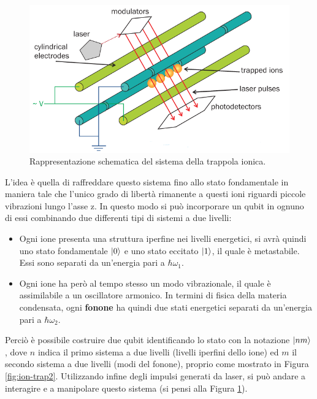 \begin{figure}[!t]
    \centering
    \includegraphics[scale=0.5]{images/ion-trap1}
    \caption{Rappresentazione schematica del sistema della trappola ionica.}
    \label{fig:ion-trap1}
\end{figure}

\noindent L'idea è quella di raffreddare questo sistema fino allo stato fondamentale in maniera tale che l'unico grado di libertà rimanente a questi ioni riguardi piccole vibrazioni lungo l'asse z. In questo modo si può incorporare un qubit in ognuno di essi combinando due differenti tipi di sistemi a due livelli:
\begin{itemize}
    \item Ogni ione presenta una struttura iperfine nei livelli energetici, si avrà quindi uno stato fondamentale $\ket 0$ e uno stato eccitato $\ket 1$, il quale è metastabile. Essi sono separati da un'energia pari a $\hbar\omega_1$.
    
    \item Ogni ione ha però al tempo stesso un modo vibrazionale, il quale è assimilabile a un oscillatore armonico. In termini di fisica della materia condensata, ogni \textbf{fonone} ha quindi due stati energetici separati da un'energia pari a $\hbar\omega_2$.
\end{itemize}

\noindent Perciò è possibile costruire due qubit identificando lo stato con la notazione $\ket{nm}$, dove $n$ indica il primo sistema a due livelli (livelli iperfini dello ione) ed $m$ il secondo sistema a due livelli (modi del fonone), proprio come mostrato in Figura \ref{fig:ion-trap2}. Utilizzando infine degli impulsi generati da laser, si può andare a interagire e a manipolare questo sistema (si pensi alla Figura \ref{fig:ion-trap1}).


